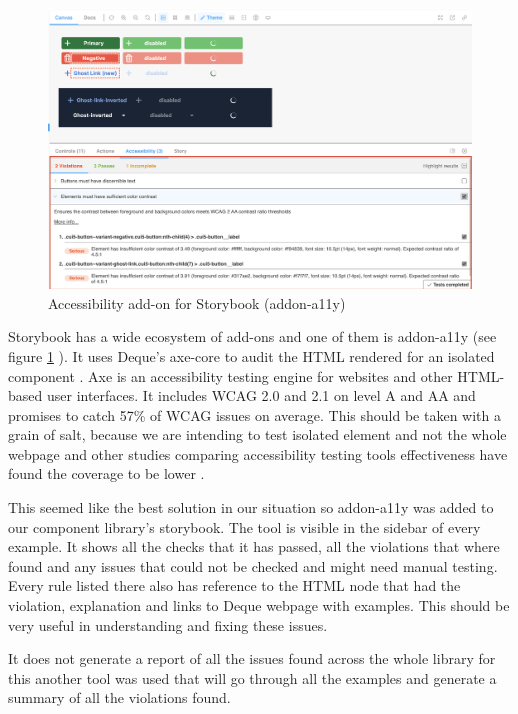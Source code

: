 \documentclass{master_thesis}
\begin{document}
\begin{figure}[h]
	\includegraphics[width=\textwidth]{img/addon-a11y.png}
	\caption{Accessibility add-on for Storybook (addon-a11y)}
	\label{fig:addon-a11y}
\end{figure}

Storybook has a wide ecosystem of add-ons and one of them is addon-a11y (see figure \ref{fig:addon-a11y} ). It uses Deque's axe-core to audit the HTML rendered for an isolated component \citep{addon-a11y}. Axe is an accessibility testing engine for websites and other HTML-based user interfaces. It includes WCAG 2.0 and 2.1 on level A and AA and promises to catch 57\% of WCAG issues on average. \citep{Deque2023} This should be taken with a grain of salt, because we are intending to test isolated element and not the whole webpage and other studies comparing accessibility testing tools effectiveness have found the coverage to be lower  .

This seemed like the best solution in our situation so addon-a11y was added to our component library's storybook. The tool is visible in the sidebar of every example. It shows all the checks that it has passed, all the violations that where found and any issues that could not be checked and might need manual testing. Every rule listed there also has reference to the HTML node that had the violation, explanation and links to Deque webpage with examples. This should be very useful in understanding and fixing these issues.

It does not generate a report of all the issues found across the whole library for this another tool was used that will go through all the examples and generate a summary of all the violations found.
\end{document}

